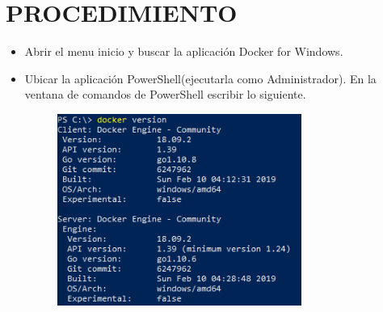 \section{PROCEDIMIENTO} 

\begin{itemize}
\subsection{ Habriendo  Docker}
	\item Abrir el menu inicio y buscar la aplicación Docker for Windows.

	\item Ubicar la aplicación PowerShell(ejecutarla como Administrador). En la ventana de comandos de PowerShell escribir
lo siguiente.
		\begin{figure}[H]
		\begin{center}
		\includegraphics[width=8cm]{./Imagenes/1}
		\end{center}
		\end{figure}
     

\end{itemize}
